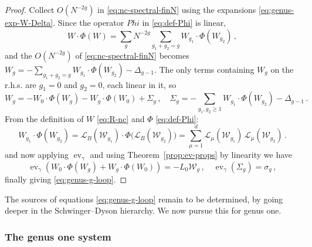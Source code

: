 \documentclass[11pt,a4paper]{article}
\DeclareMathOperator{\ev}{ev}
\newcommand{\cW}{\mathcal{W}}
\newcommand{\cL}{\mathcal{L}}
\begin{document}
\begin{proof}
Collect $O(N^{-2g})$ in \eqref{eq:nc-spectral-finN} using the expansions \eqref{eq:genus-exp-W-Delta}. Since the operator $Phi$ in \eqref{eq:def-Phi} is linear,
%
\begin{equation}
W\cdot\Phi(W)=\sum_g N^{-2g}\sum_{g_1+g_2=g}W_{g_1}\cdot\Phi(W_{g_2})\,,
\end{equation}
%
and the $O(N^{-2g})$ of \eqref{eq:nc-spectral-finN} becomes $W_g=-\sum_{g_1+g_2=g}W_{g_1}\cdot\Phi(W_{g_2})-\Delta_{g-1}$. The only terms containing $W_g$ on the r.h.s. are $g_1=0$ and $g_2=0$, each linear in it, so 
%
\begin{equation}
W_g = -W_0\cdot\Phi(W_g) - W_g\cdot\Phi(W_0)+\Sigma_g\,,\quad \Sigma_g=-\sum_{g_1,g_2\geq1}W_{g_1}\cdot\Phi(W_{g_2})-\Delta_{g-1}\,.
\end{equation}
%
From the definition of $W$ \eqref{eq:R-nc} and $\Phi$ \eqref{eq:def-Phi}:
%
\begin{equation}
   W_{g_1}\cdot\Phi(W_{g_2})= \cL_B(\cW_{g_1})\cdot\Phi\bigl(\cL_B(\cW_{g_2})\bigr)
  = \sum_{\mu=1}^d \cL_\mu(\cW_{g_1})\,\cL_\mu(\cW_{g_2})\,.
\end{equation}
and now applying $\ev_\gamma$ and using Theorem~\ref{prop:ev-props} by linearity we have
%
\begin{equation}
\ev_\gamma\left(W_0\cdot\Phi(W_g)+W_g\cdot\Phi(W_0)\right)=-L_0\cW_g\,,\quad \ev_\gamma(\Sigma_g)=\sigma_g\,,
\end{equation}
finally giving \eqref{eq:genus-g-loop}.
\end{proof}
The sources of equations \eqref{eq:genus-g-loop} remain to be determined, by going deeper in the Schwinger--Dyson hierarchy. We now pursue this for genus one. 

\subsubsection{The genus one system}\label{ex:g01}
\end{document}
